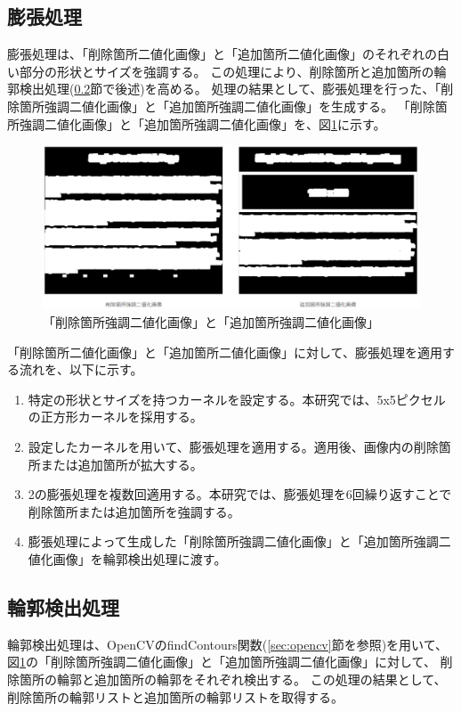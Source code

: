 \subsection{膨張処理}\label{subsec:dilation}
膨張処理は、「削除箇所二値化画像」と「追加箇所二値化画像」のそれぞれの白い部分の形状とサイズを強調する。
この処理により、削除箇所と追加箇所の輪郭検出処理(\ref{subsec:contour_detection_processing}節で後述)を高める。
処理の結果として、膨張処理を行った、「削除箇所強調二値化画像」と「追加箇所強調二値化画像」を生成する。
「削除箇所強調二値化画像」と「追加箇所強調二値化画像」を、図\ref{fig: img_del_add_highlight_bin}に示す。
\begin{figure}[tp]
    \begin{center}
        \includegraphics[width=1.0\columnwidth]{image/4_img_del_add_highlight_bin.png}
        \caption{「削除箇所強調二値化画像」と「追加箇所強調二値化画像」}
        \label{fig: img_del_add_highlight_bin}
    \end{center}
\end{figure}
\par
「削除箇所二値化画像」と「追加箇所二値化画像」に対して、膨張処理を適用する流れを、以下に示す。
\begin{enumerate}
    \item 特定の形状とサイズを持つカーネルを設定する。本研究では、5x5ピクセルの正方形カーネルを採用する。
    \item 設定したカーネルを用いて、膨張処理を適用する。適用後、画像内の削除箇所または追加箇所が拡大する。
    \item 2の膨張処理を複数回適用する。本研究では、膨張処理を6回繰り返すことで削除箇所または追加箇所を強調する。
    \item 膨張処理によって生成した「削除箇所強調二値化画像」と「追加箇所強調二値化画像」を輪郭検出処理に渡す。
\end{enumerate}

\subsection{輪郭検出処理}\label{subsec:contour_detection_processing}
輪郭検出処理は、OpenCVのfindContours関数(\ref{sec:opencv}節を参照)を用いて、図\ref{fig: img_del_add_highlight_bin}の「削除箇所強調二値化画像」と「追加箇所強調二値化画像」に対して、
削除箇所の輪郭と追加箇所の輪郭をそれぞれ検出する。
この処理の結果として、削除箇所の輪郭リストと追加箇所の輪郭リストを取得する。

